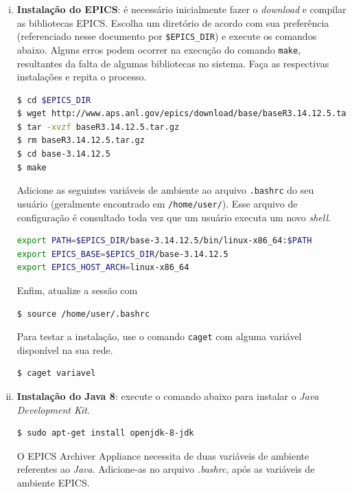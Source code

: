 \begin {enumerate}[i.] 
  \item \textbf{Instalação do EPICS}: é necessário inicialmente fazer o
  \textit{download} e compilar as bibliotecas EPICS. Escolha um diretório de
  acordo com sua preferência (referenciado nesse documento por
  \texttt{\$EPICS\_DIR}) e execute os comandos abaixo. Alguns erros podem
  ocorrer na execução do comando \texttt{make}, resultantes da falta de algumas
  bibliotecas no sistema. Faça as respectivas instalações e repita o processo.
\begin{lstlisting}[language=bash, style=nonumbers]
$ cd $EPICS_DIR
$ wget http://www.aps.anl.gov/epics/download/base/baseR3.14.12.5.tar.gz
$ tar -xvzf baseR3.14.12.5.tar.gz
$ rm baseR3.14.12.5.tar.gz
$ cd base-3.14.12.5
$ make
\end{lstlisting}

Adicione as seguintes variáveis de ambiente ao arquivo \texttt{.bashrc} do seu
usuário (geralmente encontrado em \texttt{/home/user/}). Esse arquivo de
configuração é consultado toda vez que um usuário executa um novo
\textit{shell}.
\begin{lstlisting}[language=bash, style=nonumbers]
export PATH=$EPICS_DIR/base-3.14.12.5/bin/linux-x86_64:$PATH
export EPICS_BASE=$EPICS_DIR/base-3.14.12.5
export EPICS_HOST_ARCH=linux-x86_64
\end{lstlisting}	

Enfim, atualize a sessão com

\begin{lstlisting}[language=bash, style=nonumbers]
$ source /home/user/.bashrc
\end{lstlisting}	

Para testar a instalação, use o comando \texttt{caget} com
alguma variável disponível na sua rede.

\begin{lstlisting}[language=bash, style=nonumbers]
$ caget variavel
\end{lstlisting}

\item \textbf{Instalação do Java 8}: execute o comando abaixo para instalar o
\textit{Java Development Kit}.
\begin{lstlisting}[language=bash, style=nonumbers]
$ sudo apt-get install openjdk-8-jdk
\end{lstlisting}

O EPICS Archiver Appliance necessita de duas variáveis de ambiente referentes ao
\textit{Java}. Adicione-as no arquivo \textit{.bashrc}, após as variáveis de
ambiente EPICS.


\end{enumerate}
